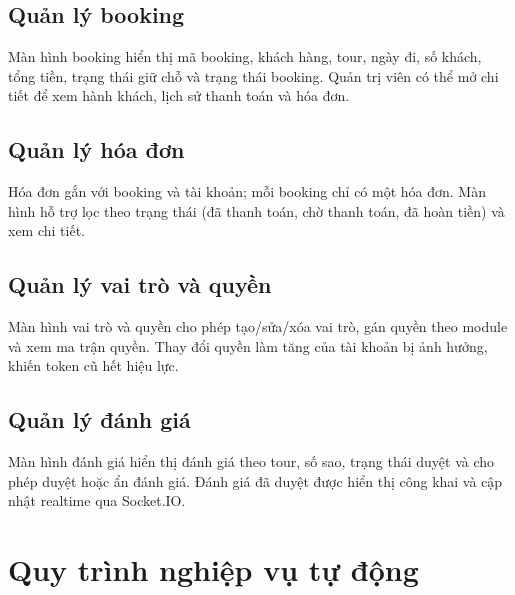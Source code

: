 \subsection{Quản lý booking}

Màn hình booking hiển thị mã booking, khách hàng, tour, ngày đi, số khách, tổng tiền, trạng thái giữ chỗ và trạng thái booking. Quản trị viên có thể mở chi tiết để xem hành khách, lịch sử thanh toán và hóa đơn.


\subsection{Quản lý hóa đơn}

Hóa đơn gắn với booking và tài khoản; mỗi booking chỉ có một hóa đơn. Màn hình hỗ trợ lọc theo trạng thái (đã thanh toán, chờ thanh toán, đã hoàn tiền) và xem chi tiết.


\subsection{Quản lý vai trò và quyền}

Màn hình vai trò và quyền cho phép tạo/sửa/xóa vai trò, gán quyền theo module và xem ma trận quyền. Thay đổi quyền làm tăng  của tài khoản bị ảnh hưởng, khiến token cũ hết hiệu lực.


\subsection{Quản lý đánh giá}

Màn hình đánh giá hiển thị đánh giá theo tour, số sao, trạng thái duyệt và cho phép duyệt hoặc ẩn đánh giá. Đánh giá đã duyệt được hiển thị công khai và cập nhật realtime qua Socket.IO.


\section{Quy trình nghiệp vụ tự động}
\label{sec:quy-trinh-tu-dong}

